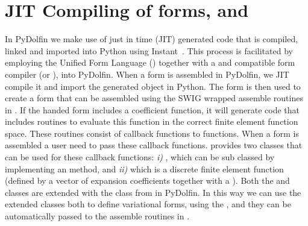 \section{JIT Compiling of \ufl forms,  and }
In PyDolfin we make use of just in time (JIT) generated \ufc code that is compiled, linked and imported into Python using Instant~\cite{WestlieMardalAlnaes2009}. This process is facilitated by employing the Unified Form Language (\ufl) together with a \ufl and \ufc compatible form compiler (\ffc or \sfc), into PyDolfin. When a \ufl form is assembled in PyDolfin, we JIT compile it and import the generated \ufc object in Python. The \ufc form is then used to create a \dolfin form that can be assembled using the SWIG wrapped assemble routines in \dolfin. If the handed \ufl form includes a coefficient function, it will generate \ufc code that includes routines to evaluate this function in the correct finite element function space. These routines consist of callback functions to \ufc functions. When a \ufc form is assembled a user need to pass these callback functions. \dolfin provides two classes that can be used for these callback functions: \textit{i)} , which can be sub classed by implementing an  method, and \textit{ii)}  which is a discrete finite element function (defined by a vector of expansion coefficients together with a ). Both the  and  classes are extended with the  class from \ufl in PyDolfin. In this way we can use the extended classes both to define variational forms, using the \ufl {}, and they can be automatically passed to the assemble routines in \dolfin. \par

